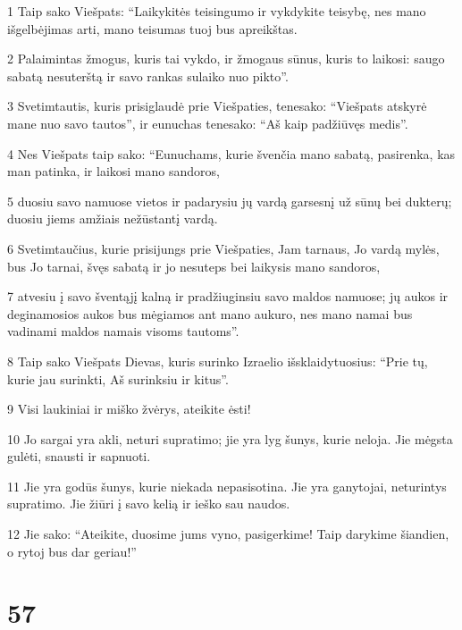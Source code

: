 \par 1 Taip sako Viešpats: “Laikykitės teisingumo ir vykdykite teisybę, nes mano išgelbėjimas arti, mano teisumas tuoj bus apreikštas. 
\par 2 Palaimintas žmogus, kuris tai vykdo, ir žmogaus sūnus, kuris to laikosi: saugo sabatą nesuterštą ir savo rankas sulaiko nuo pikto”. 
\par 3 Svetimtautis, kuris prisiglaudė prie Viešpaties, tenesako: “Viešpats atskyrė mane nuo savo tautos”, ir eunuchas tenesako: “Aš kaip padžiūvęs medis”. 
\par 4 Nes Viešpats taip sako: “Eunuchams, kurie švenčia mano sabatą, pasirenka, kas man patinka, ir laikosi mano sandoros, 
\par 5 duosiu savo namuose vietos ir padarysiu jų vardą garsesnį už sūnų bei dukterų; duosiu jiems amžiais nežūstantį vardą. 
\par 6 Svetimtaučius, kurie prisijungs prie Viešpaties, Jam tarnaus, Jo vardą mylės, bus Jo tarnai, švęs sabatą ir jo nesuteps bei laikysis mano sandoros, 
\par 7 atvesiu į savo šventąjį kalną ir pradžiuginsiu savo maldos namuose; jų aukos ir deginamosios aukos bus mėgiamos ant mano aukuro, nes mano namai bus vadinami maldos namais visoms tautoms”. 
\par 8 Taip sako Viešpats Dievas, kuris surinko Izraelio išsklaidytuosius: “Prie tų, kurie jau surinkti, Aš surinksiu ir kitus”. 
\par 9 Visi laukiniai ir miško žvėrys, ateikite ėsti! 
\par 10 Jo sargai yra akli, neturi supratimo; jie yra lyg šunys, kurie neloja. Jie mėgsta gulėti, snausti ir sapnuoti. 
\par 11 Jie yra godūs šunys, kurie niekada nepasisotina. Jie yra ganytojai, neturintys supratimo. Jie žiūri į savo kelią ir ieško sau naudos. 
\par 12 Jie sako: “Ateikite, duosime jums vyno, pasigerkime! Taip darykime šiandien, o rytoj bus dar geriau!”



\chapter{57}


